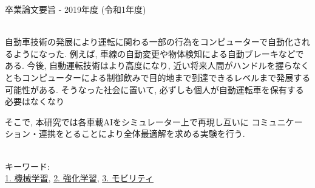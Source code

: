卒業論文要旨 - 2019年度 (令和1年度)
\begin{center}
\begin{large}
\end{large}
\end{center}

~ \\

自動車技術の発展により運転に関わる一部の行為をコンピューターで自動化されるようになった. 例えば, 車線の自動変更や物体検知による自動ブレーキなどである.
今後, 自動運転技術はより高度になり, 近い将来人間がハンドルを握らなくともコンピューターによる制御飲みで目的地まで到達できるレベルまで発展する可能性がある.
そうなった社会に置いて, 必ずしも個人が自動運転車を保有する必要はなくなり

そこで, 本研究では各車載AIをシミュレーター上で再現し互いに
コミュニケーション・連携をとることにより全体最適解を求める実験を行う.


~ \\
キーワード:\\
\underline{1. 機械学習},
\underline{2. 強化学習},
\underline{3. モビリティ}
\begin{flushright}
\dept \\
\author
\end{flushright}

